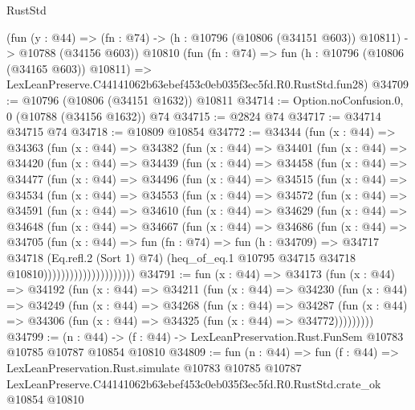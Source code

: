 \begin{lexlean}{RustStd}
\begin{coremodule}
    (fun (y : @44) =>
    (fn : @74) -> (h : @10796 (@10806 (@34151 @603)) @10811) -> @10788 (@34156 @603))
    @10810
    (fun (fn : @74) =>
    fun (h : @10796 (@10806 (@34165 @603)) @10811) =>
    LexLeanPreserve.C44141062b63ebef453c0eb035f3ec5fd.R0.RustStd.fun28)
@34709 := @10796 (@10806 (@34151 @1632)) @10811
@34714 := Option.noConfusion.{0, 0} (@10788 (@34156 @1632)) @74
@34715 := @2824 @74
@34717 := @34714 @34715 @74
@34718 := @10809 @10854
@34772 := @34344
    (fun (x : @44) =>
    @34363
      (fun (x : @44) =>
      @34382
        (fun (x : @44) =>
        @34401
          (fun (x : @44) =>
          @34420
            (fun (x : @44) =>
            @34439
              (fun (x : @44) =>
              @34458
                (fun (x : @44) =>
                @34477
                  (fun (x : @44) =>
                  @34496
                    (fun (x : @44) =>
                    @34515
                      (fun (x : @44) =>
                      @34534
                        (fun (x : @44) =>
                        @34553
                          (fun (x : @44) =>
                          @34572
                            (fun (x : @44) =>
                            @34591
                              (fun (x : @44) =>
                              @34610
                                (fun (x : @44) =>
                                @34629
                                  (fun (x : @44) =>
                                  @34648
                                    (fun (x : @44) =>
                                    @34667
                                      (fun (x : @44) =>
                                      @34686
                                        (fun (x : @44) =>
                                        @34705
                                          (fun (x : @44) =>
                                          fun (fn : @74) =>
                                          fun (h : @34709) =>
                                          @34717
                                            @34718
                                            (Eq.refl.{2} (Sort 1) @74)
                                            (heq_of_eq.{1}
                                              @10795
                                              @34715
                                              @34718
                                              @10810)))))))))))))))))))))
@34791 := fun (x : @44) =>
  @34173
    (fun (x : @44) =>
    @34192
      (fun (x : @44) =>
      @34211
        (fun (x : @44) =>
        @34230
          (fun (x : @44) =>
          @34249
            (fun (x : @44) =>
            @34268
              (fun (x : @44) =>
              @34287
                (fun (x : @44) => @34306 (fun (x : @44) => @34325 (fun (x : @44) => @34772)))))))))
@34799 := (n : @44) ->
  (f : @44) -> LexLeanPreservation.Rust.FunSem @10783 @10785 @10787 @10854 @10810
@34809 := fun (n : @44) =>
  fun (f : @44) =>
  LexLeanPreservation.Rust.simulate
    @10783
    @10785
    @10787
    LexLeanPreserve.C44141062b63ebef453c0eb035f3ec5fd.R0.RustStd.crate_ok
    @10854
    @10810
\end{coremodule}
\end{lexlean}
